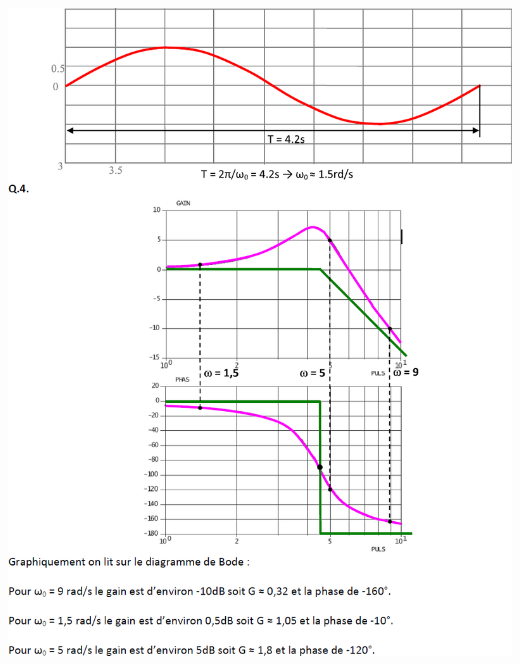\documentclass[10pt,fleqn]{article} %
\begin{document}
\begin{center}
\includegraphics[width=\textwidth]{images/cor_02}


\end{center}
\end{document}
